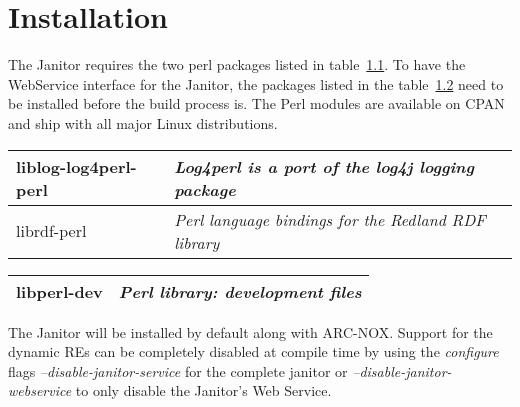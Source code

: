 \chapter{Installation} 




The Janitor requires the two perl packages listed in
table~\ref{tab:install_dependencies}. To have
the WebService interface for the Janitor, the packages listed in the
table~\ref{tab:install_dependencies_optional} need to be installed before
the build process is. The Perl modules are available on CPAN and ship
with all major Linux distributions.

\begin{table}[!h]
   \begin{center}
        \label{tab:install_dependencies}
	\begin{tabular}{|p{3cm}|p{7cm}|}
	\hline
	   liblog-log4perl-perl & \textit{Log4perl is a port of the log4j logging package}\\
	\hline
	   librdf-perl          & \textit{Perl language bindings for the Redland RDF library}\\
	\hline
	\end{tabular} 
   \end{center}
\end{table}
\begin{table}[!h]
   \begin{center}
        \label{tab:install_dependencies_optional}
	\begin{tabular}{|p{3cm}|p{7cm}|}
	\hline
	   libperl-dev & \textit{ Perl library: development files}\\
	\hline
	\end{tabular}
   \end{center}
\end{table}
\forcelinebreak

The Janitor will be installed by default along with ARC-NOX. Support for
the dynamic REs can be completely disabled at compile time by using
the \textit{configure} flags \textit{--disable-janitor-service} for
the complete janitor or \textit{--disable-janitor-webservice} to only
disable the Janitor's Web Service.

